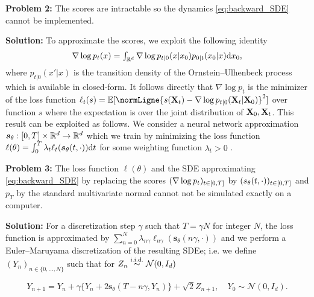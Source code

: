 \textbf{Problem 2:} The scores are intractable so the dynamics \eqref{eq:backward_SDE} cannot be implemented. 

\textbf{Solution:} To approximate the scores, we exploit the following identity 
\begin{equation}\label{eq:scoreidentity}
  \textstyle{\nabla \log p_t(x) = \int_{\mathbb{R}^d} \nabla \log p_{t|0}(x|x_0) p_{0|t}(x_0|x) \mathrm{d}x_0,}
\end{equation}
where $p_{t|0}(x'|x)$ is the transition density of the Ornstein--Ulhenbeck process which is available in closed-form. It follows directly that $\nabla \log p_t$ is the minimizer of the loss function
$\ell_t(s) = \expeLigne{\normLigne{s(\bfX_t) - \nabla \log
    p_{t|0}(\bfX_t|\bfX_0)}^2}$ over function $s$ where the expectation is over the joint distribution of $\mathbf{X}_0,\mathbf{X}_t$. This result can be exploited as follows. We consider a neural network approximation $\bm{s}_\theta: \left[0,T\right] \times \mathbb{R}^d \to \mathbb{R}^d$ which we train by minimizing the loss function $\ell(\theta)=\int_0^T \lambda_t \ell_{t}(\bm{s}_\theta(t,\cdot))\mathrm{d} t$ for some weighting function $\lambda_t>0$ . 


\textbf{Problem 3:} The loss function $\ell(\theta)$ and the SDE approximating \eqref{eq:backward_SDE} by replacing the scores $(\nabla \log p_t)_{t \in \left[0,T\right]}$ by $(s_\theta(t,\cdot))_{t \in \left[0,T\right]}$ and $p_T$ by the standard multivariate normal cannot not be simulated exactly on a computer.

\textbf{Solution:} For a discretization step $\gamma$ such that $T=\gamma N$ for integer $N$, the loss function is approximated by $\sum_{n=0}^N \lambda_{n\gamma} \ell_{n \gamma}(\bm{s}_\theta(n \gamma,\cdot))$ and we perform a Euler--Maruyama discretization of the resulting SDEe; i.e. we define $(Y_n)_{n \in \{0, \dots, N\}}$ such that for $Z_n\overset{\textup{i.i.d.}}{\sim} \mathcal{N}(0,I_d)$
    
    
    
\begin{equation}\label{eq:backward_discrete_final}
  Y_{n+1} = Y_n + \gamma \{Y_n + 2  \bm{s}_\theta(T -n \gamma, Y_n) \} + \sqrt{2} Z_{n+1},\quad Y_0\sim \mathcal{N}(0,I_d).
\end{equation}




